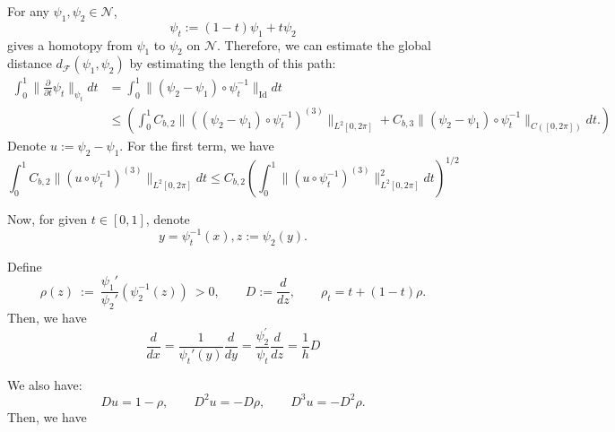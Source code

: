 \documentclass[12pt]{amsart}
\numberwithin{equation}{section}
\theoremstyle{remark}
\begin{document}
For any $\psi_1, \psi_2 \in \mathcal N$,
\begin{equation}
    \psi_t :=(1-t)\psi_1 + t \psi_2
\end{equation}
gives a homotopy from $\psi_1$ to $\psi_2$ on $\mathcal N$. Therefore, we can estimate the global distance $d_{\mathcal F}(\psi_1, \psi_2)$ by estimating the length of this path:
\begin{equation}
    \begin{aligned}
    \int_0^{1} \|\frac{\partial}{\partial t}\psi_t\|_{\psi_t} dt &= \int_0^1 \|(\psi_2-\psi_1)\circ \psi_t^{-1}\|_{\operatorname{Id}} dt\\
    &\le \left(\int_0^1 C_{b,2}\|((\psi_2-\psi_1)\circ \psi_t^{-1})^{(3)}\|_{L^2{[0,2\pi]}}+C_{b,3}\|(\psi_2-\psi_1)\circ \psi_t^{-1}\|_{C([0,2\pi])}dt. \right)
    \end{aligned}
\end{equation}
Denote $u:=\psi_2-\psi_1$. For the first term, we have
\begin{equation}
\int_0^1 C_{b,2}\|(u\circ \psi_t^{-1})^{(3)}\|_{L^2{[0,2\pi]}}dt \le C_{b,2}\left(\int_{0}^{1}\|(u\circ \psi_t^{-1})^{(3)}\|_{L^2{[0,2\pi]}}^2 dt\right)^{1/2}
\end{equation}

Now, for given $t\in [0,1]$, denote
\begin{equation}
    y = \psi_t^{-1}(x), z := \psi_2(y).
\end{equation}

Define
\begin{equation}
\rho(z)\ :=\ \frac{\psi_1'}{\psi_2'}(\psi_2^{-1}(z))\ >0,\qquad
D:=\frac{d}{dz}, \qquad \rho_t = t+(1-t)\rho.
\end{equation}
Then, we have
\begin{equation}
   \frac{d}{dx} = \frac{1}{\psi_t'(y)}\frac{d}{dy} = \frac{\psi_2^\prime}{\psi_t}\frac{d}{d z} = \frac{1}{h} D
\end{equation}

We also have:
\begin{equation}
Du = 1-\rho,\qquad D^2 u = -D\rho,\qquad D^3 u = -D^2\rho.
\end{equation}
Then, we have
\end{document}
